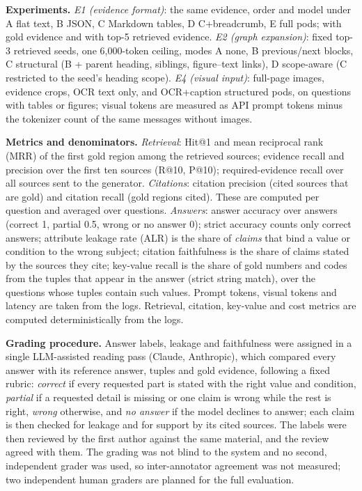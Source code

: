 \documentclass[runningheads]{llncs}
\begin{document}
\textbf{Experiments.} \emph{E1 (evidence format)}: the same evidence, order and model under A flat text, B JSON, C Markdown tables, D C+breadcrumb, E full pods; with gold evidence and with top-5 retrieved evidence. \emph{E2 (graph expansion)}: fixed top-3 retrieved seeds, one 6{,}000-token ceiling, modes A none, B previous/next blocks, C structural (B + parent heading, siblings, figure--text links), D scope-aware (C restricted to the seed's heading scope). \emph{E4 (visual input)}: full-page images, evidence crops, OCR text only, and OCR+caption structured pods, on questions with tables or figures; visual tokens are measured as API prompt tokens minus the tokenizer count of the same messages without images.

\textbf{Metrics and denominators.} \emph{Retrieval}: Hit@1 and mean reciprocal rank (MRR) of the first gold region among the retrieved sources; evidence recall and precision over the first ten sources (R@10, P@10); required-evidence recall over all sources sent to the generator. \emph{Citations}: citation precision (cited sources that are gold) and citation recall (gold regions cited). These are computed per question and averaged over questions. \emph{Answers}: answer accuracy over answers (correct 1, partial 0.5, wrong or no answer 0); strict accuracy counts only correct answers; attribute leakage rate (ALR) is the share of \emph{claims} that bind a value or condition to the wrong subject; citation faithfulness is the share of claims stated by the sources they cite; key-value recall is the share of gold numbers and codes from the tuples that appear in the answer (strict string match), over the questions whose tuples contain such values. Prompt tokens, visual tokens and latency are taken from the logs. Retrieval, citation, key-value and cost metrics are computed deterministically from the logs.

\textbf{Grading procedure.} Answer labels, leakage and faithfulness were assigned in a single LLM-assisted reading pass (Claude, Anthropic), which compared every answer with its reference answer, tuples and gold evidence, following a fixed rubric: \emph{correct} if every requested part is stated with the right value and condition, \emph{partial} if a requested detail is missing or one claim is wrong while the rest is right, \emph{wrong} otherwise, and \emph{no answer} if the model declines to answer; each claim is then checked for leakage and for support by its cited sources. The labels were then reviewed by the first author against the same material, and the review agreed with them. The grading was not blind to the system and no second, independent grader was used, so inter-annotator agreement was not measured; two independent human graders are planned for the full evaluation.
\end{document}
